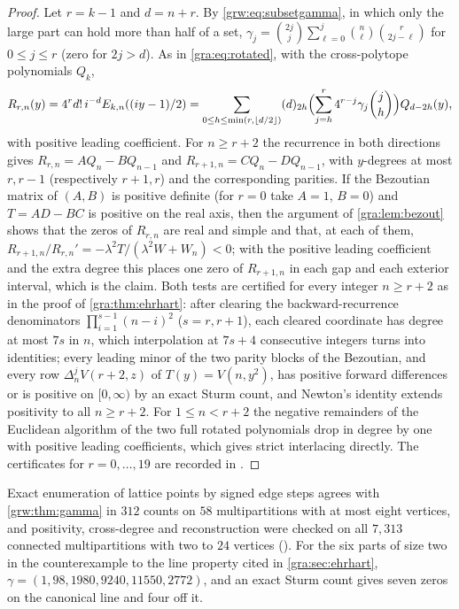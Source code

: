 \begin{proof}
Let $r=k-1$ and $d=n+r$. By \eqref{grw:eq:subsetgamma}, in which only the
large part can hold more than half of a set,
$\gamma_j=\binom{2j}j\sum_{\ell=0}^j\binom n\ell\binom r{2j-\ell}$ for
$0\le j\le r$ (zero for $2j>d$). As in \eqref{gra:eq:rotated}, with the
cross-polytope polynomials $Q_k$,
\[
 R_{r,n}(y)=4^rd!\,i^{-d}E_{k,n}((iy-1)/2)=\sum_{0\le h\le\min(r,\lfloor d/2\rfloor)}
 (d)_{2h}\Bigl(\sum_{j=h}^r4^{r-j}\gamma_j\binom jh\Bigr)Q_{d-2h}(y),
\]
with positive leading coefficient. For $n\ge r+2$ the recurrence in both
directions gives $R_{r,n}=AQ_n-BQ_{n-1}$ and $R_{r+1,n}=CQ_n-DQ_{n-1}$, with
$y$-degrees at most $r,r-1$ (respectively $r+1,r$) and the corresponding
parities. If the Bezoutian matrix of $(A,B)$ is positive definite (for
$r=0$ take $A=1$, $B=0$) and $T=AD-BC$ is positive on the real axis, then
the argument of \cref{gra:lem:bezout} shows that the zeros of $R_{r,n}$ are
real and simple and that, at each of them,
$R_{r+1,n}/R_{r,n}'=-\lambda^2T/(\lambda^2W+W_n)<0$; with the positive
leading coefficient and the extra degree this places one zero of
$R_{r+1,n}$ in each gap and each exterior interval, which is the claim. Both
tests are certified for every integer $n\ge r+2$ as in the proof of
\cref{gra:thm:ehrhart}: after clearing the backward-recurrence denominators
$\prod_{i=1}^{s-1}(n-i)^2$ ($s=r,r+1$), each cleared coordinate has degree
at most $7s$ in $n$, which interpolation at $7s+4$ consecutive integers
turns into identities; every leading minor of the two parity blocks of the
Bezoutian, and every row $\Delta_n^jV(r+2,z)$ of $T(y)=V(n,y^2)$, has
positive forward differences or is positive on $[0,\infty)$ by an exact
Sturm count, and Newton's identity extends positivity to all $n\ge r+2$. For
$1\le n<r+2$ the negative remainders of the Euclidean algorithm of the two
full rotated polynomials drop in degree by one with positive leading
coefficients, which gives strict interlacing directly. The certificates for
$r=0,\dots,19$ are recorded in
.
\end{proof}

Exact enumeration of lattice points by signed edge steps agrees with
\cref{grw:thm:gamma} in $312$ counts on $58$ multipartitions with at most
eight vertices, and positivity, cross-degree and reconstruction were checked
on all $7{,}313$ connected multipartitions with two to $24$ vertices
(). For the six parts of size two
in the counterexample to the line property cited in \cref{gra:sec:ehrhart},
$\gamma=(1,98,1980,9240,11550,2772)$, and an exact Sturm count gives seven
zeros on the canonical line and four off it.

